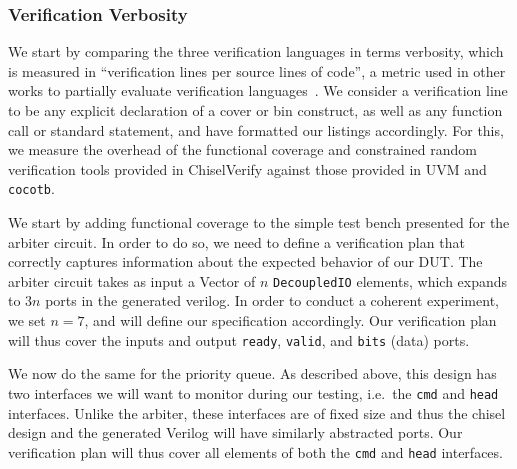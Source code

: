 \documentclass[conference]{IEEEtran}
\begin{document}
\subsubsection{Verification Verbosity}
We start by comparing the three verification languages in terms verbosity, which is measured in ``verification lines per source lines of code'', a metric used in other works to partially evaluate verification languages~\cite{Nagini:2018, MuellerSchwerhoffSummers16, dobisCoverage:ETS22}.
We consider a verification line to be any explicit declaration of a cover or bin construct, as well as any function call or standard statement, and have formatted our listings accordingly.
For this, we measure the overhead of the functional coverage and constrained random verification tools provided in ChiselVerify against those provided in UVM and \texttt{cocotb}.

We start by adding functional coverage to the simple test bench presented for the arbiter circuit. 
In order to do so, we need to define a verification plan that correctly captures information about the expected behavior of our DUT.
The arbiter circuit takes as input a Vector of $n$ \texttt{DecoupledIO} elements, which expands to $3n$ ports in the generated verilog.
In order to conduct a coherent experiment, we set $n = 7$, and will define our specification accordingly.
Our verification plan will thus cover the inputs and output \texttt{ready}, \texttt{valid}, and \texttt{bits} (data) ports.

We now do the same for the priority queue. 
As described above, this design has two interfaces we will want to monitor during our testing, i.e.\ the \texttt{cmd} and \texttt{head} interfaces.
Unlike the arbiter, these interfaces are of fixed size and thus the chisel design and the generated Verilog will have similarly abstracted ports.
Our verification plan will thus cover all elements of both the \texttt{cmd} and \texttt{head} interfaces.
 
\end{document}
